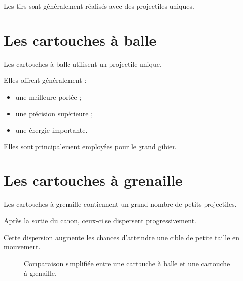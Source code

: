Les tirs sont généralement réalisés avec des projectiles uniques.

\section{Les cartouches à balle}

Les cartouches à balle utilisent un projectile unique.

Elles offrent généralement :

\begin{itemize}
    \item une meilleure portée ;
    \item une précision supérieure ;
    \item une énergie importante.
\end{itemize}

Elles sont principalement employées pour le grand gibier.

\section{Les cartouches à grenaille}

Les cartouches à grenaille contiennent un grand nombre de petits projectiles.

Après la sortie du canon, ceux-ci se dispersent progressivement.

Cette dispersion augmente les chances d'atteindre une cible de petite taille en
mouvement.

\begin{figure}[htbp]
\centering


\caption{Comparaison simplifiée entre une cartouche à balle et une cartouche à grenaille.}
\label{fig:balle_grenaille}

\end{figure}


